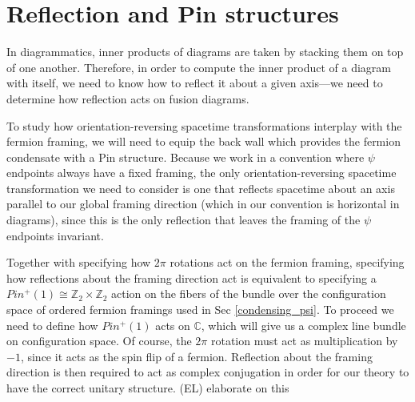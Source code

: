 \documentclass[12pt,a4paper]{article}
\newcommand{\cc}{\mathbb{C}}
\newcommand{\zt}{\mathbb{Z}_2}
\newcommand\be            {\begin{equation}}
\newcommand\ee            {\end{equation}}
\newcommand{\ethan}[1]{{\color{amethyst}\footnotesize{(EL) #1}}}
\begin{document}

\section{Reflection and Pin structures} \label{pins_and_reflection}

In diagrammatics, inner products of diagrams are taken by stacking them on top of one another. 
Therefore, in order to compute the inner product of a diagram with itself, we need to know how to reflect it about a given axis---we need to determine how reflection acts on fusion diagrams. 

To study how orientation-reversing spacetime transformations interplay with the fermion framing, we will need to equip the back wall which provides the fermion condensate with a Pin structure. Because we work in a convention where $\psi$ endpoints always have a fixed framing, the only orientation-reversing spacetime transformation we need to consider is one that  reflects spacetime about an axis parallel to our global framing direction (which in our convention is horizontal in diagrams), since this is the only reflection that leaves the framing of the $\psi$ endpoints invariant. 

Together with specifying how $2\pi$ rotations act on the fermion framing, specifying how reflections about the framing direction act is equivalent to specifying a $Pin^+(1) \cong \zt \times \zt$ action on the fibers of the bundle over the configuration space of ordered fermion framings used in Sec \ref{condensing_psi}. To proceed we need to define how $Pin^+(1)$ acts on $\cc$, which will give us a complex line bundle on configuration space. Of course, the $2\pi$ rotation must act as multiplication by $-1$, since it acts as the spin flip of a fermion. Reflection about the framing direction is then required to act as complex conjugation in order for our theory to have the correct unitary structure. \ethan{elaborate on this}
\end{document}
